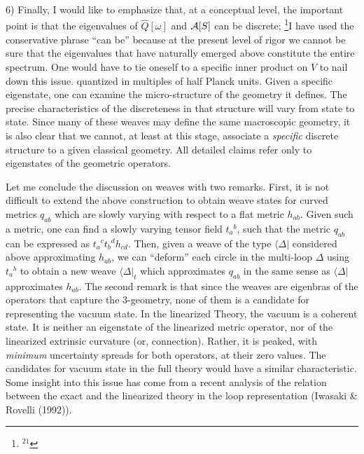 \item{6)} {Finally, I would like to emphasize that, at a conceptual level,
the important point is that the eigenvalues of $\hat{Q}[\omega ]$ and
${\cal A}[S]$ can be discrete;%
\footnote{$^{21}$}{I have used the conservative phrase ``can be'' because
at the present level of rigor we cannot be sure that the eigenvalues that
have naturally emerged above constitute the entire spectrum. One would have
to tie oneself to a specific inner product on $V$ to nail down this issue.}
quantized in multiples of half Planck units. Given a specific eigenstate, one
can examine the micro-structure of the geometry it defines. The precise
characteristics of the discreteness in that structure will vary from state
to state. Since many of these weaves may define the same macroscopic geometry,
it is also clear that we cannot, at least at this stage, associate a {\it
specific} discrete structure to a given classical geometry. All detailed
claims refer only to eigenstates of the geometric operators.}

Let me conclude the discussion on weaves with two remarks. First, it is not
difficult to extend the above construction to obtain weave states for curved
metrics $q_{ab}$ which are slowly varying with respect to a flat metric
$h_{ab}$. Given such a metric, one can find a slowly varying tensor field
$t_a{}^b$, such that the metric $q_{ab}$ can be expressed as $t_a{}^c
t_b{}^d h_{cd}$. Then, given a weave of the type $\langle\Delta|$ considered
above approximating $h_{ab}$, we can ``deform'' each circle in the multi-loop
$\Delta$ using $t_a{}^b$ to obtain a new weave $\langle \Delta |_{t}$ which
approximates $q_{ab}$ in the same sense as $\langle\Delta|$ approximates
$h_{ab}$. The second remark is that since the weaves are eigenbras of the
operators that capture the 3-geometry, none of them is a candidate for
representing the vacuum state. In the linearized Theory, the vacuum is a
coherent state. It is neither an eigenstate of the linearized metric operator,
nor of the linearized extrinsic curvature (or, connection). Rather, it is
peaked, with {\it minimum} uncertainty spreads for both operators, at their
zero values. The candidates for vacuum state in the full theory would have a
similar characteristic. Some insight into this issue has come from a recent
analysis of the relation between the exact and the linearized theory in the
loop representation (Iwasaki \& Rovelli (1992)).

